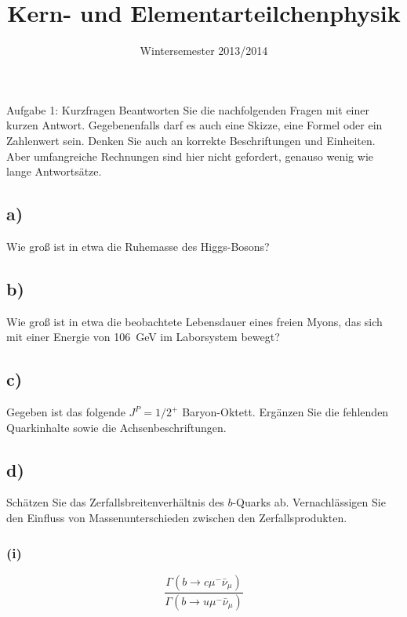 

\subject{KET}
\title{Kern- und Elementarteilchenphysik}
\date{
    Wintersemester 2013/2014
}



\maketitle
\thispagestyle{empty}
\newpage


\begin{aufgabe}{Aufgabe 1: Kurzfragen}
    Beantworten Sie die nachfolgenden Fragen mit einer kurzen Antwort.
    Gegebenenfalls darf es auch eine Skizze, eine Formel oder ein Zahlenwert sein.
    Denken Sie auch an korrekte Beschriftungen und Einheiten.
    Aber umfangreiche Rechnungen sind hier nicht gefordert, genauso wenig wie lange Antwortsätze.

    \subsection{a)}
    Wie groß ist in etwa die Ruhemasse des Higgs-Bosons?

    \subsection{b)}
    Wie groß ist in etwa die beobachtete Lebensdauer eines freien Myons,
    das sich mit einer Energie von \SI{106}{\giga\electronvolt} im Laborsystem bewegt?

    \subsection{c)}
    Gegeben ist das folgende $J^P = 1/2^+$ Baryon-Oktett.
    Ergänzen Sie die fehlenden Quarkinhalte sowie die Achsenbeschriftungen.

    \subsection{d)}
    Schätzen Sie das Zerfallsbreitenverhältnis des $b$-Quarks ab.
    Vernachlässigen Sie den Einfluss von Massenunterschieden zwischen den Zerfallsprodukten.

    \subsubsection{(i)}
    \[
        \frac{\Gamma(b \to c \mu^-\bar\nu_\mu)}{{\Gamma(b \to u \mu^-\bar\nu_\mu)}}
    \]


\end{aufgabe}
